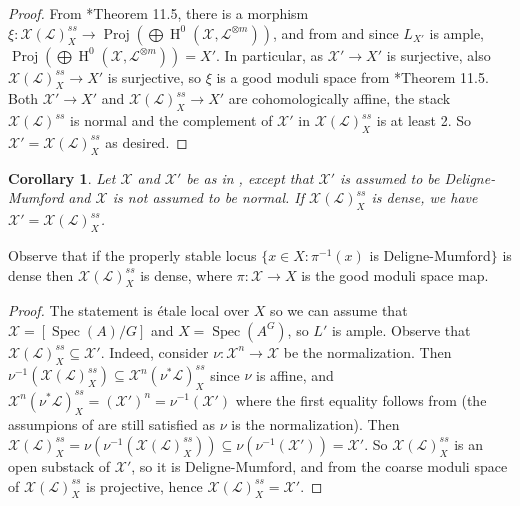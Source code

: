 \documentclass{amsart}
\newcommand{\oH}{\operatorname{H}}
\newcommand{\cL}{\mathcal{L}}
\newcommand{\cX}{\mathcal{X}}
\newcommand{\spec}{\operatorname{Spec}}
\newcommand{\Proj}{\operatorname{Proj}}
\newtheorem{Cor}[theorem]{Corollary}
\theoremstyle{definition}
\theoremstyle{definition}
\begin{document}
{\begin{proof}
    From \cite{Alp}*{Theorem 11.5}, there is a morphism $\xi:\cX(\cL)^{ss}_X\to \Proj(\bigoplus \oH^0(\cX,\cL^{\otimes m}))$, and from  and since $L_{X'}$ is ample, $\Proj(\bigoplus \oH^0(\cX,\cL^{\otimes m}))= X'$. In particular, as $\cX'\to X'$ is surjective, also $\cX(\cL)^{ss}_X\to X'$ is surjective, so $\xi$ is a good moduli space from \cite{Alp}*{Theorem 11.5}. Both $\cX'\to X'$ and $\cX(\cL)^{ss}_X\to X'$ are cohomologically affine, the stack $\cX(\cL)^{ss}$ is normal and the complement of $\cX'$ in $\cX(\cL)^{ss}_X$ is at least 2. So $\cX'=\cX(\cL)^{ss}_X$ as desired.
\end{proof}
\begin{Cor}\label{cor_when_X_dm_is_ss_locus_for_a_lb}
    Let $\cX$ and $\cX'$ be as in , except that $\cX'$ is assumed to be Deligne-Mumford and $\cX$ is not assumed to be normal. If $\cX(\cL)^{ss}_X$ is dense, we have $\cX'=\cX(\cL)^{ss}_X$.
\end{Cor}
Observe that if the properly stable locus $\{x\in X:\pi^{-1}(x)$ is Deligne-Mumford$\}$ is dense then $\cX(\cL)^{ss}_X$ is dense, where $\pi:\cX\to X$ is the good moduli space map.
\begin{proof}The statement is  \'etale local over $X$ so we can assume that $\cX=[\spec(A)/G]$ and $X=\spec(A^G)$, so $L'$ is ample. Observe that $\cX(\cL)^{ss}_X\subseteq \cX'$. Indeed,
consider $\nu:\cX^n\to \cX$ be the normalization. Then $\nu^{-1}(\cX(\cL)^{ss}_X)\subseteq \cX^n(\nu^*\cL)^{ss}_X$ since $\nu $ is affine, and $\cX^n(\nu^*\cL)^{ss}_X = (\cX')^n = \nu^{-1}(\cX')$ where the first equality follows from  (the assumpions of  are still satisfied as $\nu$ is the normalization). Then $\cX(\cL)^{ss}_X =\nu(\nu^{-1}(\cX(\cL)^{ss}_X))\subseteq \nu(\nu^{-1}(\cX'))=\cX'$. So $\cX(\cL)^{ss}_X$ is an open substack of $\cX'$, so it is Deligne-Mumford, and from  the coarse moduli space of $\cX(\cL)^{ss}_X$ is projective, hence $\cX(\cL)^{ss}_X=\cX'$.
\end{proof}

}
\end{document}

